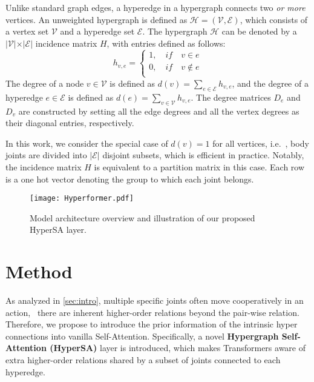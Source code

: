 \documentclass[10pt,twocolumn,letterpaper]{article}
\begin{document}
% 
Unlike standard graph edges, a hyperedge in a hypergraph connects
two \emph{or more} vertices. An unweighted hypergraph is defined as $\mathcal{H} =
(\mathcal{V}, \mathcal{E})$, which consists of a vertex set $\mathcal{V}$ and a hyperedge set $\mathcal{E}$. The hypergraph $\mathcal{H}$ can be denoted by a $\vert \mathcal{V} \vert \times \vert \mathcal{E} \vert $ incidence matrix $H$, with entries defined as follows:
\begin{equation}
\label{eq:3}
h_{v, e}=\left\{
	\begin{aligned}
	1, \quad if \quad v \in e\\
	0, \quad if \quad v \notin e\\
	\end{aligned}\right
	.
\end{equation}
%
The degree of a node $ v \in \mathcal{V}$ is defined as $ d(v) =
\sum_{e \in \mathcal{E}} h_{v, e}$, and the degree of a hyperedge $e \in \mathcal{E}$ is defined
as $d(e) = \sum_{v \in \mathcal{V}} h_{v, e}$. The degree matrices $D_e$ and $D_v$ are constructed by setting all the edge degrees and all the vertex degrees as their diagonal entries,
respectively.

In this work, we consider the special case of $d(v)=1$ for all vertices, i.e.~, body joints are divided into $\vert \mathcal{E} \vert$ disjoint subsets, which is efficient in practice. Notably, the incidence matrix $H$ is equivalent to a partition matrix in this case.
Each row is a one hot vector denoting the group to which each joint belongs.




\begin{figure*}[ht]
  \centering

      \texttt{[image: Hyperformer.pdf]}
     \caption{Model architecture overview and illustration of our proposed HyperSA layer.}
     \label{fig:model}
\end{figure*}


\section{Method}
As analyzed in \cref{sec:intro}, multiple specific joints often move cooperatively in an action, \ie~there are inherent higher-order relations beyond the pair-wise relation. Therefore, we propose to introduce the prior information of the intrinsic hyper connections into vanilla Self-Attention. Specifically, a novel \textbf{Hypergraph Self-Attention (HyperSA)} layer is introduced, which makes Transformers aware of extra higher-order relations shared by a subset of joints connected to each hyperedge. 
\end{document}
